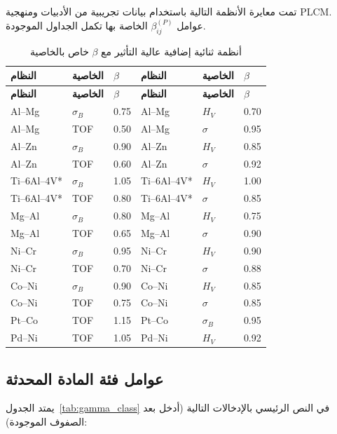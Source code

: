 \documentclass[12pt,a4paper]{article}
\begin{document}
	تمت معايرة الأنظمة التالية باستخدام بيانات تجريبية من الأدبيات ومنهجية PLCM. عوامل \(\beta_{ij}^{(P)}\) الخاصة بها تكمل الجداول الموجودة.
	
	\begin{longtable}{p{2.2cm} p{2.2cm} p{1.2cm} p{2.2cm} p{2.2cm} p{1.2cm}}
		\caption{أنظمة ثنائية إضافية عالية التأثير مع \(\beta\) خاص بالخاصية}\label{tab:beta_additional}\\
		\toprule
		\textbf{النظام} & \textbf{الخاصية} & \(\beta\) & \textbf{النظام} & \textbf{الخاصية} & \(\beta\) \\
		\midrule
		\endfirsthead
		\toprule
		\textbf{النظام} & \textbf{الخاصية} & \(\beta\) & \textbf{النظام} & \textbf{الخاصية} & \(\beta\) \\
		\midrule
		\endhead
		Al–Mg & \(\sigma_B\) & 0.75 & Al–Mg & \(H_V\) & 0.70 \\
		Al–Mg & TOF & 0.50 & Al–Mg & \(\sigma\) & 0.95 \\
		Al–Zn & \(\sigma_B\) & 0.90 & Al–Zn & \(H_V\) & 0.85 \\
		Al–Zn & TOF & 0.60 & Al–Zn & \(\sigma\) & 0.92 \\
		Ti–6Al–4V* & \(\sigma_B\) & 1.05 & Ti–6Al–4V* & \(H_V\) & 1.00 \\
		Ti–6Al–4V* & TOF & 0.80 & Ti–6Al–4V* & \(\sigma\) & 0.85 \\
		Mg–Al & \(\sigma_B\) & 0.80 & Mg–Al & \(H_V\) & 0.75 \\
		Mg–Al & TOF & 0.65 & Mg–Al & \(\sigma\) & 0.90 \\
		Ni–Cr & \(\sigma_B\) & 0.95 & Ni–Cr & \(H_V\) & 0.90 \\
		Ni–Cr & TOF & 0.70 & Ni–Cr & \(\sigma\) & 0.88 \\
		Co–Ni & \(\sigma_B\) & 0.90 & Co–Ni & \(H_V\) & 0.85 \\
		Co–Ni & TOF & 0.75 & Co–Ni & \(\sigma\) & 0.85 \\
		Pt–Co & TOF & 1.15 & Pt–Co & \(\sigma_B\) & 0.95 \\
		Pd–Ni & TOF & 1.05 & Pd–Ni & \(H_V\) & 0.92 \\
		\bottomrule
	\end{longtable}
	\vspace{0.2cm}
	
	\subsection*{عوامل فئة المادة المحدثة}
	يمتد الجدول~\ref{tab:gamma_class} في النص الرئيسي بالإدخالات التالية (أدخل بعد الصفوف الموجودة):
	
\end{document}

